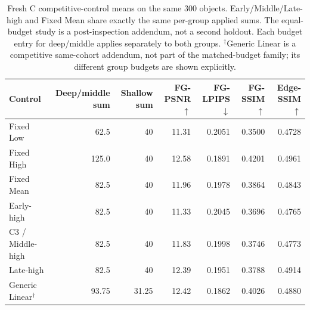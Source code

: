 \documentclass[times,twocolumn,final]{elsarticle}
\providecommand{\DIFaddbegin}{} %
\providecommand{\DIFaddend}{} %
\providecommand{\DIFdelend}{} %
\begin{document}
\DIFdelend \DIFaddbegin \begin{table}[t]
\centering\scriptsize\setlength{\tabcolsep}{4pt}
\caption{Fresh C competitive-control means on the same 300 objects. Early/Middle/Late-high and Fixed Mean share exactly the same per-group applied sums. The equal-budget study is a post-inspection addendum, not a second holdout. Each budget entry for deep/middle applies separately to both groups. $^\dagger$Generic Linear is a competitive same-cohort addendum, not part of the matched-budget family; its different group budgets are shown explicitly.}
\label{tab:freshc-absolute}\label{tab:matched-budget300}
\begin{tabular}{lrrrrrr}
\toprule Control & Deep/middle sum & Shallow sum & FG-PSNR$\uparrow$ & FG-LPIPS$\downarrow$ & FG-SSIM$\uparrow$ & Edge-SSIM$\uparrow$ \\
\midrule
Fixed Low & 62.5 & 40 & 11.31 & 0.2051 & 0.3500 & 0.4728 \\
Fixed High & 125.0 & 40 & 12.58 & 0.1891 & 0.4201 & 0.4961 \\
Fixed Mean & 82.5 & 40 & 11.96 & 0.1978 & 0.3864 & 0.4843 \\
Early-high & 82.5 & 40 & 11.33 & 0.2045 & 0.3696 & 0.4765 \\
C3 / Middle-high & 82.5 & 40 & 11.83 & 0.1998 & 0.3746 & 0.4773 \\
Late-high & 82.5 & 40 & 12.39 & 0.1951 & 0.3788 & 0.4914 \\
Generic Linear$^\dagger$ & 93.75 & 31.25 & 12.42 & 0.1862 & 0.4026 & 0.4880 \\

\bottomrule
\end{tabular}
\end{table}
\DIFaddend 
\end{document}
